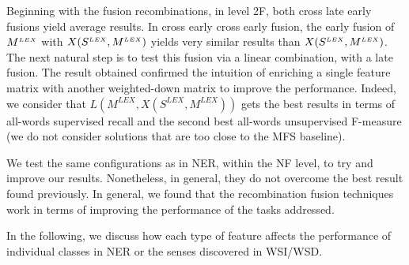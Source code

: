 Beginning with the fusion recombinations, in level 2F, both cross late early fusions yield average results. In cross early cross early fusion, the early fusion of $M^{\scriptscriptstyle LEX}$ with  $X(S^{\scriptscriptstyle LEX}, M^{\scriptscriptstyle LEX})$ yields very similar results than $X(S^{\scriptscriptstyle LEX}, M^{\scriptscriptstyle LEX})$. The next natural step is to test this fusion via a linear combination, with a late fusion. The result obtained confirmed the intuition of enriching a single feature matrix with another weighted-down matrix to improve the performance. Indeed, we consider that $L(M^{LEX}, X(S^{LEX}, M^{LEX}))$ gets the best results in terms of all-words supervised recall and the second best all-words unsupervised F-measure (we do not consider solutions that are too close to the MFS baseline). 

We test the same configurations as in NER, within the NF level, to try and improve our results. Nonetheless, in general, they do not overcome the best result found previously.
In general, we found that the recombination fusion techniques work in terms of improving the performance of the tasks addressed.

In the following, we discuss how each type of feature affects the performance of individual classes in NER or the senses discovered in WSI/WSD.

